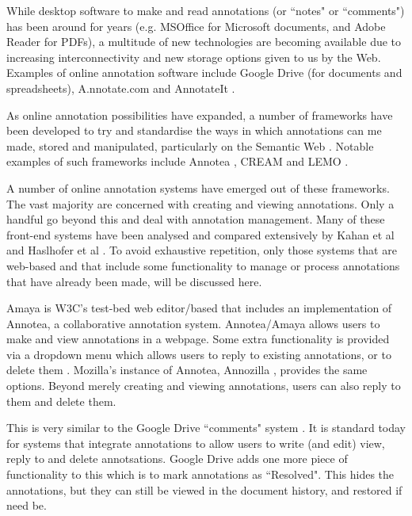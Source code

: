 While desktop software to make and read annotations (or ``notes" or ``comments") has been around for years (e.g. MSOffice \citep{MSOffice} for Microsoft documents, and Adobe Reader \citep{Adobe} for PDFs), a multitude of new technologies are becoming available due to increasing interconnectivity and new storage options given to us by the Web. Examples of online annotation software include Google Drive \citep{GDrive} (for documents and spreadsheets), A.nnotate.com \citep{AnnotateCom} and AnnotateIt \citep{AnnotateIt}.

As online annotation possibilities have expanded, a number of frameworks have been developed to try and standardise the ways in which annotations can me made, stored and manipulated, particularly on the Semantic Web \citep{Berners-Lee} \citep{Uren}. Notable examples of such frameworks include Annotea \citep{kahan2002annotea}, CREAM \citep{handschuh2002authoring} and LEMO \citep{LEMO}.  

A number of online annotation systems have emerged out of these frameworks. The vast majority are concerned with creating and viewing annotations. Only a handful go beyond this and deal with annotation management. Many of these front-end systems have been analysed and compared extensively by Kahan et al \citep{kahan2002annotea} and Haslhofer et al \citep{LEMO}. To avoid exhaustive repetition, only those systems that are web-based and that include some functionality to manage or process annotations that have already been made, will be discussed here.

Amaya \citep{Amaya} is W3C's test-bed web editor/based that includes an implementation of Annotea, a collaborative annotation system. Annotea/Amaya allows users to make and view annotations in a webpage. Some extra functionality is provided via a dropdown menu which allows users to reply to existing annotations, or to delete them \citep{Annotea}. Mozilla's instance of Annotea, Annozilla \citep{Annozilla}, provides the same options. Beyond merely creating and viewing annotations, users can also reply to them and delete them. 

This is very similar to the Google Drive ``comments" system \citep{GDrive}. It is standard today for systems that integrate annotations to allow users to write (and edit) view, reply to and delete annotsations. Google Drive adds one more piece of functionality to this which is to mark annotations as ``Resolved". This hides the annotations, but they can still be viewed in the document history, and restored if need be.


